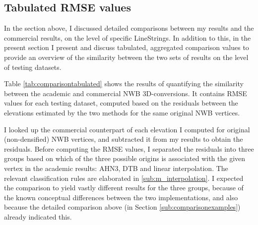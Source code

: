 \subsection{Tabulated RMSE values}
\label{sub:comparisontabulated}

In the section above, I discussed detailed comparisons between my results and the commercial results, on the level of specific LineStrings. In addition to this, in the present section I present and discuss tabulated, aggregated comparison values to provide an overview of the similarity between the two sets of results on the level of testing datasets.

\begin{table}
    \caption{Tabulated academic and commercial 3D-NWB similarity quantification results.
    \label{tab:comparisontabulated}.}
\end{table}

Table \ref{tab:comparisontabulated} shows the results of quantifying the similarity between the academic and commercial NWB 3D-conversions. It contains RMSE values for each testing dataset, computed based on the residuals between the elevations estimated by the two methods for the same original NWB vertices.

I looked up the commercial counterpart of each elevation I computed for original (non-densified) NWB vertices, and subtracted it from my results to obtain the residuals. Before computing the RMSE values, I separated the residuals into three groups based on which of the three possible origins is associated with the given vertex in the academic results: AHN3, DTB and linear interpolation. The relevant classification rules are elaborated in \ref{sub:m_interpolation}. I expected the comparison to yield vastly different results for the three groups, because of the known conceptual differences between the two implementations, and also because the detailed comparison above (in Section \ref{sub:comparisonexamples}) already indicated this.

